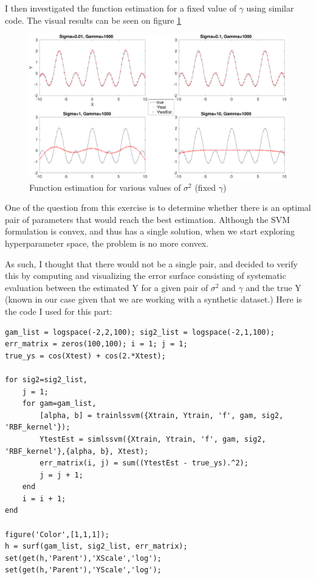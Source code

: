 \documentclass[11pt, a4paper]{article}
\begin{document}
I then investigated the function estimation for a fixed value of
$\gamma$ using similar code. The visual results can be seen on figure
\ref{fig:sumcos2}

\begin{figure}[H]
  \vspace{-50pt}
    \centering
    \includegraphics[scale=.40]{sumcos2.pdf}
    \caption{Function estimation for various values of $\sigma^2$ (fixed
      $\gamma$)}
    \label{fig:sumcos2}
\end{figure}

One of the question from this exercise is to determine whether there
is an optimal pair of parameters that would reach the best
estimation. Although the SVM formulation is convex, and thus has a
single solution, when we start exploring hyperparameter space, the
problem is no more convex. 

As such, I thought that there would not be a single pair, and decided
to verify this by computing and visualizing the error surface
consisting of systematic evaluation between the estimated Y for a
given pair of $\sigma^2$ and $\gamma$ and the true Y (known in our
case given that we are working with a synthetic dataset.) Here is the
code I used for this part:

\begin{lstlisting}
gam_list = logspace(-2,2,100); sig2_list = logspace(-2,1,100);
err_matrix = zeros(100,100); i = 1; j = 1;
true_ys = cos(Xtest) + cos(2.*Xtest);

for sig2=sig2_list,
    j = 1;
    for gam=gam_list,
        [alpha, b] = trainlssvm({Xtrain, Ytrain, 'f', gam, sig2, 'RBF_kernel'});
        YtestEst = simlssvm({Xtrain, Ytrain, 'f', gam, sig2, 'RBF_kernel'},{alpha, b}, Xtest);
        err_matrix(i, j) = sum((YtestEst - true_ys).^2);
        j = j + 1;
    end
    i = i + 1;
end

figure('Color',[1,1,1]);
h = surf(gam_list, sig2_list, err_matrix);
set(get(h,'Parent'),'XScale','log');
set(get(h,'Parent'),'YScale','log');
\end{lstlisting}
\end{document}
